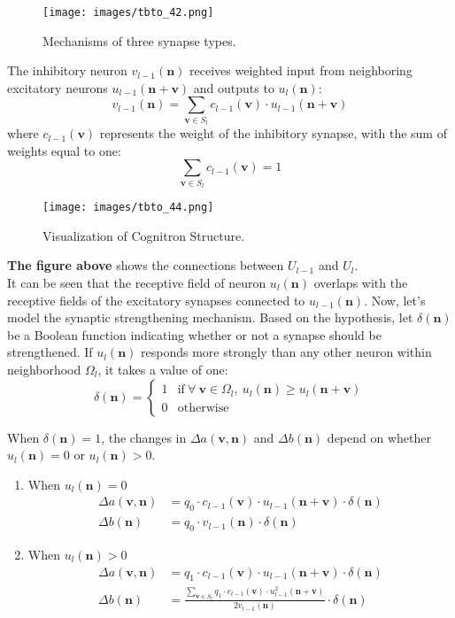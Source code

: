 \documentclass[11p,oneside]{book}
\begin{document}
\begin{figure}[H]
    \centering
    \texttt{[image: images/tbto\_42.png]}
    \caption{Mechanisms of three synapse types.}
\end{figure}

The inhibitory neuron $v_{l-1}(\mathbf{n})$ receives weighted input from neighboring excitatory neurons $u_{l-1}(\mathbf{n+v})$ and outputs to $u_l(\mathbf{n})$:
$$
v_{l-1}(\mathbf{n}) = \sum_{\mathbf{v} \in S_l} c_{l-1}(\mathbf{v}) \cdot u_{l-1}(\mathbf{n+v})
$$
where $c_{l-1}(\mathbf{v})$ represents the weight of the inhibitory synapse, with the sum of weights equal to one:
$$
\sum_{\mathbf{v} \in S_l} c_{l-1}(\mathbf{v}) = 1
$$

\begin{figure}[H]
    \centering
    \texttt{[image: images/tbto\_44.png]}
    \caption{Visualization of Cognitron Structure.}
\end{figure}

\textbf{The figure above} shows the connections between $U_{l-1}$ and $U_l$. \\

It can be seen that the receptive field of neuron $u_l(\mathbf{n})$ overlaps with the receptive fields of the excitatory synapses connected to $u_{l-1}(\mathbf{n})$. Now, let’s model the synaptic strengthening mechanism. Based on the hypothesis, let $\delta(\mathbf{n})$ be a Boolean function indicating whether or not a synapse should be strengthened. If $u_l(\mathbf{n})$ responds more strongly than any other neuron within neighborhood $\Omega_l$, it takes a value of one:
$$
\delta(\mathbf{n}) = 
\begin{cases}
1 & \text{if} \ \forall \ \mathbf{v} \in \Omega_l, \ u_l(\mathbf{n}) \geq u_l(\mathbf{n+v}) \\
0 & \text{otherwise}
\end{cases}
$$

When $\delta(\mathbf{n}) = 1$, the changes in $\Delta a(\mathbf{v, n})$ and $\Delta b(\mathbf{n})$ depend on whether $u_l(\mathbf{n})=0$ or $u_l(\mathbf{n}) > 0$.

\begin{enumerate}
        \item When $u_l(\mathbf{n}) = 0$
        \begin{align*}
        \Delta a(\mathbf{v, n}) &= q_0 \cdot c_{l-1}(\mathbf{v}) \cdot u_{l-1}(\mathbf{n+v}) \cdot \delta(\mathbf{n}) \\
        \Delta b(\mathbf{n}) &= q_0 \cdot v_{l-1}(\mathbf{n}) \cdot \delta(\mathbf{n})
        \end{align*}
        \item 
        When $u_l(\mathbf{n}) > 0$
        \begin{align*}
        \Delta a(\mathbf{v, n}) &= q_1 \cdot c_{l-1}(\mathbf{v}) \cdot u_{l-1}(\mathbf{n+v}) \cdot \delta(\mathbf{n}) \\
        \Delta b(\mathbf{n}) &= \frac{\sum_{\mathbf{v} \in S_l} q_1 \cdot c_{l-1}(\mathbf{v}) \cdot u_{l-1}^2(\mathbf{n+v})}{2v_{l-1}(\mathbf{n})} \cdot \delta(\mathbf{n})
        \end{align*}        
\end{enumerate}
\end{document}
